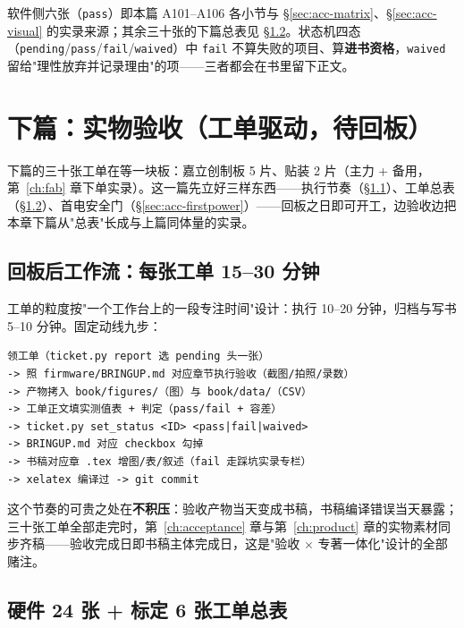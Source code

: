 软件侧六张（\texttt{pass}）即本篇 A101--A106 各小节与 \S\ref{sec:acc-matrix}、\S\ref{sec:acc-visual} 的实录来源；其余三十张的下篇总表见 \S\ref{sec:acc-hw-table}。状态机四态（\texttt{pending}/\texttt{pass}/\texttt{fail}/\texttt{waived}）中 \texttt{fail} 不算失败的项目、算\textbf{进书资格}，\texttt{waived} 留给"理性放弃并记录理由"的项——三者都会在书里留下正文。

\section{下篇：实物验收（工单驱动，待回板）}
\label{sec:acc-hw}

下篇的三十张工单在等一块板：嘉立创制板 5 片、贴装 2 片（主力 + 备用，第~\ref{ch:fab} 章下单实录）。这一篇先立好三样东西——执行节奏（\S\ref{sec:acc-workflow}）、工单总表（\S\ref{sec:acc-hw-table}）、首电安全门（\S\ref{sec:acc-firstpower}）——回板之日即可开工，边验收边把本章下篇从"总表"长成与上篇同体量的实录。

\subsection{回板后工作流：每张工单 15--30 分钟}
\label{sec:acc-workflow}

工单的粒度按"一个工作台上的一段专注时间"设计：执行 10--20 分钟，归档与写书 5--10 分钟。固定动线九步：

\begin{lstlisting}[basicstyle=\small\ttfamily, breaklines=true,
  caption={单张工单动线（spec 2026-10-02-acceptance-book-design.md §4）}]
领工单（ticket.py report 选 pending 头一张）
-> 照 firmware/BRINGUP.md 对应章节执行验收（截图/拍照/录数）
-> 产物拷入 book/figures/（图）与 book/data/（CSV）
-> 工单正文填实测值表 + 判定（pass/fail + 容差）
-> ticket.py set_status <ID> <pass|fail|waived>
-> BRINGUP.md 对应 checkbox 勾掉
-> 书稿对应章 .tex 增图/表/叙述（fail 走踩坑实录专栏）
-> xelatex 编译过 -> git commit
\end{lstlisting}

这个节奏的可贵之处在\textbf{不积压}：验收产物当天变成书稿，书稿编译错误当天暴露；三十张工单全部走完时，第~\ref{ch:acceptance} 章与第~\ref{ch:product} 章的实物素材同步齐稿——验收完成日即书稿主体完成日，这是"验收 $\times$ 专著一体化"设计的全部赌注。

\subsection{硬件 24 张 + 标定 6 张工单总表}
\label{sec:acc-hw-table}


